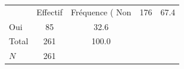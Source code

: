 {
\def\sym#1{\ifmmode^{#1}\else\(^{#1}\)\fi}
\begin{tabular}{l*{1}{cc}}
\toprule
            &    Effectif&Fréquence (%
\midrule
Non         &         176&        67.4\\
Oui         &          85&        32.6\\
Total       &         261&       100.0\\
\midrule
\(N\)       &         261&            \\
\bottomrule
\end{tabular}
}
